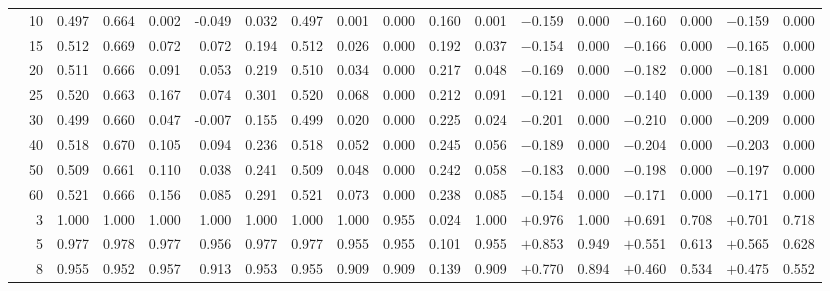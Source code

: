 \documentclass[conference]{IEEEtran}
\theoremstyle{remark}
\begin{document}
\begin{table}[ht]
{\begin{tabular}{p{2.2cm}r rrrr rr rr rr rr rr rr}
  & 10 & 0.497 & 0.664 & 0.002 & -0.049 & 0.032 & 0.497 & 0.001 & 0.000 & 0.160 & 0.001 & $-$0.159 & 0.000 & $-$0.160 & 0.000 & $-$0.159 & 0.000 \\
  & 15 & 0.512 & 0.669 & 0.072 & 0.072 & 0.194 & 0.512 & 0.026 & 0.000 & 0.192 & 0.037 & $-$0.154 & 0.000 & $-$0.166 & 0.000 & $-$0.165 & 0.000 \\
  & 20 & 0.511 & 0.666 & 0.091 & 0.053 & 0.219 & 0.510 & 0.034 & 0.000 & 0.217 & 0.048 & $-$0.169 & 0.000 & $-$0.182 & 0.000 & $-$0.181 & 0.000 \\
  & 25 & 0.520 & 0.663 & 0.167 & 0.074 & 0.301 & 0.520 & 0.068 & 0.000 & 0.212 & 0.091 & $-$0.121 & 0.000 & $-$0.140 & 0.000 & $-$0.139 & 0.000 \\
  & 30 & 0.499 & 0.660 & 0.047 & -0.007 & 0.155 & 0.499 & 0.020 & 0.000 & 0.225 & 0.024 & $-$0.201 & 0.000 & $-$0.210 & 0.000 & $-$0.209 & 0.000 \\
  & 40 & 0.518 & 0.670 & 0.105 & 0.094 & 0.236 & 0.518 & 0.052 & 0.000 & 0.245 & 0.056 & $-$0.189 & 0.000 & $-$0.204 & 0.000 & $-$0.203 & 0.000 \\
  & 50 & 0.509 & 0.661 & 0.110 & 0.038 & 0.241 & 0.509 & 0.048 & 0.000 & 0.242 & 0.058 & $-$0.183 & 0.000 & $-$0.198 & 0.000 & $-$0.197 & 0.000 \\
  & 60 & 0.521 & 0.666 & 0.156 & 0.085 & 0.291 & 0.521 & 0.073 & 0.000 & 0.238 & 0.085 & $-$0.154 & 0.000 & $-$0.171 & 0.000 & $-$0.171 & 0.000 \\
\midrule
{}
  & 3  & 1.000 & 1.000 & 1.000 & 1.000 & 1.000 & 1.000 & 1.000 & 0.955 & 0.024 & 1.000 & $+$0.976 & 1.000 & $+$0.691 & 0.708 & $+$0.701 & 0.718 \\
  & 5  & 0.977 & 0.978 & 0.977 & 0.956 & 0.977 & 0.977 & 0.955 & 0.955 & 0.101 & 0.955 & $+$0.853 & 0.949 & $+$0.551 & 0.613 & $+$0.565 & 0.628 \\
  & 8  & 0.955 & 0.952 & 0.957 & 0.913 & 0.953 & 0.955 & 0.909 & 0.909 & 0.139 & 0.909 & $+$0.770 & 0.894 & $+$0.460 & 0.534 & $+$0.475 & 0.552 \\

\end{tabular}}
\end{table}
\end{document}
